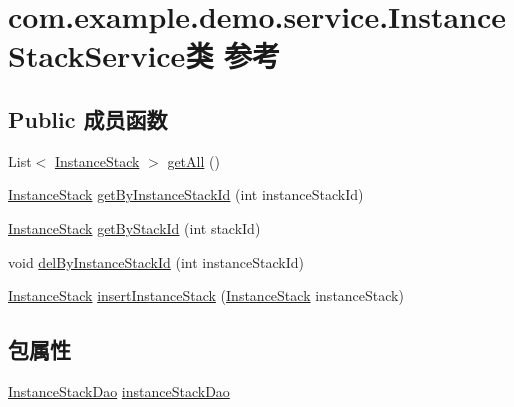 \hypertarget{classcom_1_1example_1_1demo_1_1service_1_1_instance_stack_service}{}\section{com.\+example.\+demo.\+service.\+Instance\+Stack\+Service类 参考}
\label{classcom_1_1example_1_1demo_1_1service_1_1_instance_stack_service}
\subsection*{Public 成员函数}
\begin{DoxyCompactItemize}
\item 
List$<$ \mbox{\hyperlink{classcom_1_1example_1_1demo_1_1modular_1_1_instance_stack}{Instance\+Stack}} $>$ \mbox{\hyperlink{classcom_1_1example_1_1demo_1_1service_1_1_instance_stack_service_a1de656c03af0268a36ea79477e1d2757}{get\+All}} ()
\item 
\mbox{\hyperlink{classcom_1_1example_1_1demo_1_1modular_1_1_instance_stack}{Instance\+Stack}} \mbox{\hyperlink{classcom_1_1example_1_1demo_1_1service_1_1_instance_stack_service_a3b49bea8377e5787f489487ef7872e11}{get\+By\+Instance\+Stack\+Id}} (int instance\+Stack\+Id)
\item 
\mbox{\hyperlink{classcom_1_1example_1_1demo_1_1modular_1_1_instance_stack}{Instance\+Stack}} \mbox{\hyperlink{classcom_1_1example_1_1demo_1_1service_1_1_instance_stack_service_a7e23e13463cadc987d62aac4e07e3dd4}{get\+By\+Stack\+Id}} (int stack\+Id)
\item 
void \mbox{\hyperlink{classcom_1_1example_1_1demo_1_1service_1_1_instance_stack_service_ad2cbb65d383867e194a9e8b632394fff}{del\+By\+Instance\+Stack\+Id}} (int instance\+Stack\+Id)
\item 
\mbox{\hyperlink{classcom_1_1example_1_1demo_1_1modular_1_1_instance_stack}{Instance\+Stack}} \mbox{\hyperlink{classcom_1_1example_1_1demo_1_1service_1_1_instance_stack_service_aa230f3c838d3a44c8cea1c0183175094}{insert\+Instance\+Stack}} (\mbox{\hyperlink{classcom_1_1example_1_1demo_1_1modular_1_1_instance_stack}{Instance\+Stack}} instance\+Stack)
\end{DoxyCompactItemize}
\subsection*{包属性}
\begin{DoxyCompactItemize}
\item 
\mbox{\hyperlink{interfacecom_1_1example_1_1demo_1_1dao_1_1_instance_stack_dao}{Instance\+Stack\+Dao}} \mbox{\hyperlink{classcom_1_1example_1_1demo_1_1service_1_1_instance_stack_service_a433fca150bef7b1da81e8a1d62b56daa}{instance\+Stack\+Dao}}
\end{DoxyCompactItemize}


